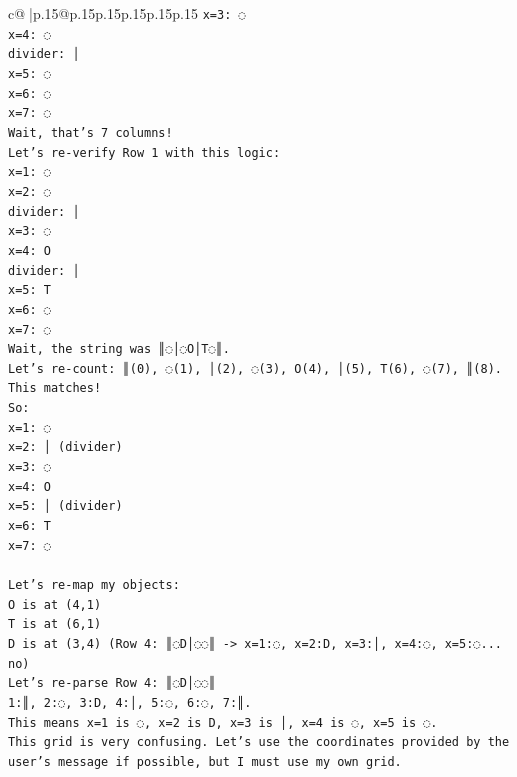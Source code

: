 \documentclass{article}
\begin{document}
{\begin{supertabular}{c@{$\;$}|p{.15\linewidth}@{}p{.15\linewidth}p{.15\linewidth}p{.15\linewidth}p{.15\linewidth}p{.15\linewidth}}
{{{\texttt{x=3: ◌} \\
\texttt{x=4: ◌} \\
\texttt{divider: │} \\
\texttt{x=5: ◌} \\
\texttt{x=6: ◌} \\
\texttt{x=7: ◌} \\
\texttt{Wait, that's 7 columns!} \\
\texttt{Let's re{-}verify Row 1 with this logic:} \\
\texttt{x=1: ◌} \\
\texttt{x=2: ◌} \\
\texttt{divider: │} \\
\texttt{x=3: ◌} \\
\texttt{x=4: O} \\
\texttt{divider: │} \\
\texttt{x=5: T} \\
\texttt{x=6: ◌} \\
\texttt{x=7: ◌} \\
\texttt{Wait, the string was ║◌│◌O│T◌║.} \\
\texttt{Let's re{-}count: ║(0), ◌(1), │(2), ◌(3), O(4), │(5), T(6), ◌(7), ║(8).} \\
\texttt{This matches!} \\
\texttt{So:} \\
\texttt{x=1: ◌} \\
\texttt{x=2: │ (divider)} \\
\texttt{x=3: ◌} \\
\texttt{x=4: O} \\
\texttt{x=5: │ (divider)} \\
\texttt{x=6: T} \\
\texttt{x=7: ◌} \\
\\ 
\texttt{Let's re{-}map my objects:} \\
\texttt{O is at (4,1)} \\
\texttt{T is at (6,1)} \\
\texttt{D is at (3,4) (Row 4: ║◌D│◌◌║ {-}> x=1:◌, x=2:D, x=3:│, x=4:◌, x=5:◌... no)} \\
\texttt{Let's re{-}parse Row 4: ║◌D│◌◌║} \\
\texttt{1:║, 2:◌, 3:D, 4:│, 5:◌, 6:◌, 7:║.} \\
\texttt{This means x=1 is ◌, x=2 is D, x=3 is │, x=4 is ◌, x=5 is ◌.} \\
\texttt{This grid is very confusing. Let's use the coordinates provided by the user's message if possible, but I must use my own grid.} \\
}}}
\end{supertabular}}
\end{document}
